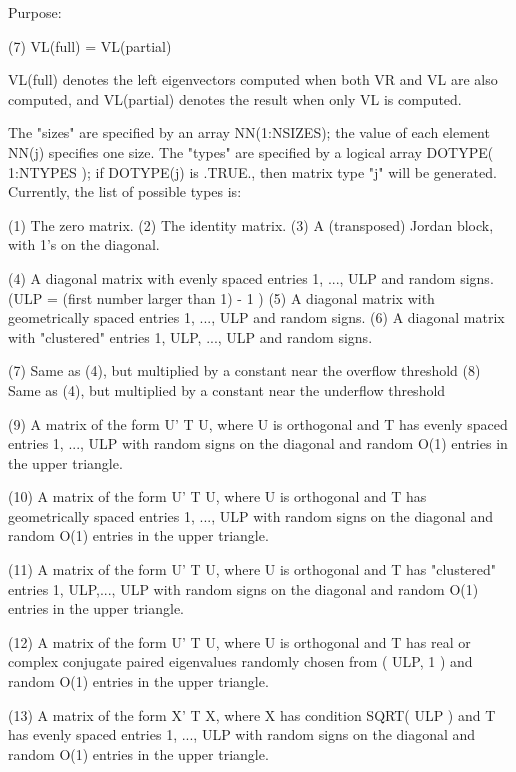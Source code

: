 \begin{DoxyParagraph}{Purpose\+: }
\begin{DoxyVerb}
     (7)     VL(full) = VL(partial)

      VL(full) denotes the left eigenvectors computed when both VR
      and VL are also computed, and VL(partial) denotes the result
      when only VL is computed.

    The "sizes" are specified by an array NN(1:NSIZES); the value of
    each element NN(j) specifies one size.
    The "types" are specified by a logical array DOTYPE( 1:NTYPES );
    if DOTYPE(j) is .TRUE., then matrix type "j" will be generated.
    Currently, the list of possible types is:

    (1)  The zero matrix.
    (2)  The identity matrix.
    (3)  A (transposed) Jordan block, with 1's on the diagonal.

    (4)  A diagonal matrix with evenly spaced entries
         1, ..., ULP  and random signs.
         (ULP = (first number larger than 1) - 1 )
    (5)  A diagonal matrix with geometrically spaced entries
         1, ..., ULP  and random signs.
    (6)  A diagonal matrix with "clustered" entries 1, ULP, ..., ULP
         and random signs.

    (7)  Same as (4), but multiplied by a constant near
         the overflow threshold
    (8)  Same as (4), but multiplied by a constant near
         the underflow threshold

    (9)  A matrix of the form  U' T U, where U is orthogonal and
         T has evenly spaced entries 1, ..., ULP with random signs
         on the diagonal and random O(1) entries in the upper
         triangle.

    (10) A matrix of the form  U' T U, where U is orthogonal and
         T has geometrically spaced entries 1, ..., ULP with random
         signs on the diagonal and random O(1) entries in the upper
         triangle.

    (11) A matrix of the form  U' T U, where U is orthogonal and
         T has "clustered" entries 1, ULP,..., ULP with random
         signs on the diagonal and random O(1) entries in the upper
         triangle.

    (12) A matrix of the form  U' T U, where U is orthogonal and
         T has real or complex conjugate paired eigenvalues randomly
         chosen from ( ULP, 1 ) and random O(1) entries in the upper
         triangle.

    (13) A matrix of the form  X' T X, where X has condition
         SQRT( ULP ) and T has evenly spaced entries 1, ..., ULP
         with random signs on the diagonal and random O(1) entries
         in the upper triangle.


\end{DoxyVerb}
\end{DoxyParagraph}
